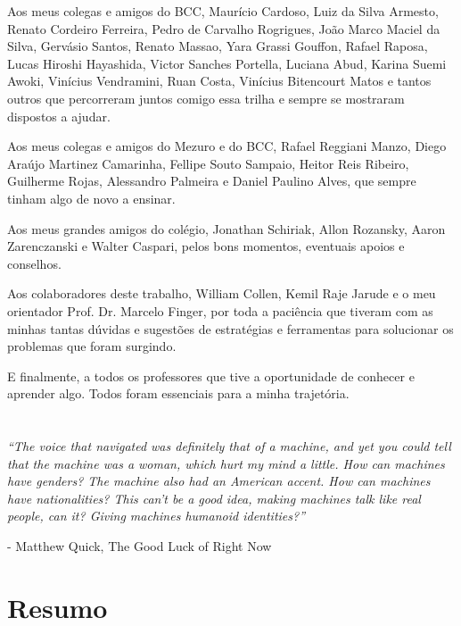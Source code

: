 \documentclass[11pt]{report}
\newcommand{\quotes}[1]{``#1''}
\begin{document}
Aos meus colegas e amigos do BCC, Maurício Cardoso, Luiz da Silva Armesto, Renato Cordeiro Ferreira, Pedro de Carvalho Rogrigues, João Marco Maciel da Silva,
Gervásio Santos, Renato Massao, Yara Grassi Gouffon, Rafael Raposa, Lucas Hiroshi Hayashida, Victor Sanches Portella, Luciana Abud, Karina Suemi Awoki, Vinícius Vendramini, Ruan Costa,
Vinícius Bitencourt Matos e tantos outros que percorreram juntos comigo essa trilha e sempre se mostraram dispostos a ajudar.

Aos meus colegas e amigos do Mezuro e do BCC, Rafael Reggiani Manzo, Diego Araújo Martinez Camarinha, Fellipe Souto Sampaio, Heitor Reis Ribeiro, Guilherme Rojas, Alessandro Palmeira e
Daniel Paulino Alves, que sempre tinham algo de novo a ensinar.

Aos meus grandes amigos do colégio, Jonathan Schiriak, Allon Rozansky, Aaron Zarenczanski e Walter Caspari, pelos bons momentos, eventuais apoios e conselhos.

Aos colaboradores deste trabalho, William Collen, Kemil Raje Jarude e o meu orientador Prof. Dr. Marcelo Finger, por toda a paciência que tiveram com as minhas tantas dúvidas e
sugestões de estratégias e ferramentas para solucionar os problemas que foram surgindo.

E finalmente, a todos os professores que tive a oportunidade de conhecer e aprender algo. Todos foram essenciais para a minha trajetória.

\pagebreak
\thispagestyle{empty}
\chapter*{}

\vspace*{\fill}
\textit{\quotes{The voice that navigated was definitely that of a machine, and yet you could tell that the machine was a woman, which hurt my mind a little. How can machines have genders? The machine also had an American accent. How can machines have nationalities? This can't be a good idea, making machines talk like real people, can it? Giving machines humanoid identities?}}
\begin{flushright} - Matthew Quick, The Good Luck of Right Now \end{flushright}
\vspace*{\fill}

\pagebreak
\thispagestyle{empty}
\chapter*{Resumo}
\end{document}
